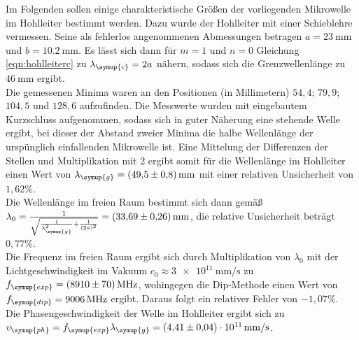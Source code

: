 Im Folgenden sollen einige charakteristische Größen der vorliegenden Mikrowelle im Hohlleiter bestimmt werden.
Dazu wurde der Hohlleiter mit einer Schieblehre vermessen. Seine als fehlerlos angenommenen Abmessungen betragen $a = \SI{23}{\milli\meter}$ und $b = \SI{10.2}{\milli\meter}$. Es lässt sich dann für $m=1$ und $n=0$ Gleichung \eqref{eqn:hohlleiterc} zu $\lambda_\symup{c} = 2a$ nähern, sodass sich die Grenzwellenlänge zu $\SI{46}{\milli\meter}$ ergibt.\\
Die gemessenen Minima waren an den Positionen (in Millimetern) $54{,}4$; $79{,}9$; $104{,}5$ und $128{,}6$ aufzufinden. Die Messwerte wurden mit eingebautem Kurzschluss aufgenommen, sodass sich in guter Näherung eine stehende Welle ergibt, bei dieser der Abstand zweier Minima die halbe Wellenlänge der urspünglich einfallenden Mikrowelle ist. Eine Mittelung der Differenzen der Stellen und Multiplikation mit 2 ergibt somit für die Wellenlänge im Hohlleiter einen Wert von $\lambda_\symup{g} = \SI{49.5(8)}{\milli\meter}$ mit einer relativen Unsicherheit von $1{,}62\%$.\\
Die Wellenlänge im freien Raum bestimmt sich dann gemäß $\lambda_0 = \frac{1}{\sqrt{ \frac{1}{\lambda_\symup{g}^2} + \frac{1}{(2a)^2}}} = \SI{33.69(26)}{\milli\meter}$, die relative Unsicherheit beträgt $0{,}77\%$.\\
Die Frequenz im freien Raum ergibt sich durch Multiplikation von $\lambda_0$ mit der Lichtgeschwindigkeit im Vakuum $c_0 \approx \SI{3e11}{\milli\meter\per\second}$ zu $f_\symup{exp} = \SI{8910(70)}{\mega\hertz}$, wohingegen die Dip-Methode einen Wert von $f_\symup{dip} = \SI{9006}{\mega\hertz}$ ergibt. Daraus folgt ein relativer Fehler von $-1{,}07\%$.\\
Die Phasengeschwindigkeit der Welle im Hohlleiter ergibt sich zu $v_\symup{ph} = f_\symup{exp} \lambda_\symup{g} = \SI{4.41(4)e+11}{\milli\meter\per\second}$.


